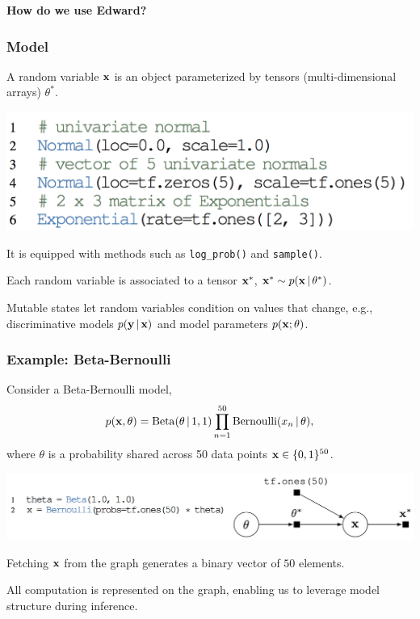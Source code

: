 \documentclass[10pt,
               xcolor={usenames,dvipsnames},
               hyperref={colorlinks,linktoc=all,citecolor=Plum,linkcolor=MidnightBlue,urlcolor=MidnightBlue},noamssymb]{beamer}
\begin{document}
\begin{frame}
\begin{center}
{\Large\bf How do we use Edward?}
\end{center}
\end{frame}

\begin{frame}
\frametitle{Model}
A random variable $\boldsymbol{\mathbf{x}}$ is an object parameterized by tensors
(multi-dimensional arrays) $\theta^*$.

\vspace{-1.0ex}
\includegraphics[height=0.20\textwidth]{img/random_variables.png}

It is equipped with methods such as \texttt{log\_prob()} and \texttt{sample()}.

Each random variable is associated to a tensor $\boldsymbol{\mathbf{x}}^*$, $\boldsymbol{\mathbf{x}}^*\sim p(\boldsymbol{\mathbf{x}}\,|\,\theta^*)$.

Mutable states let random variables condition on values that
change, e.g., discriminative models $p(\boldsymbol{\mathbf{y}}\,|\,\boldsymbol{\mathbf{x}})$ and model
parameters $p(\boldsymbol{\mathbf{x}}; \theta)$.
\end{frame}

\begin{frame}
\frametitle{Example: Beta-Bernoulli}
Consider a Beta-Bernoulli model,
\begin{align*}
p(\boldsymbol{\mathbf{x}}, \theta) =
\operatorname{Beta}(\theta\,|\, 1, 1)
\prod_{n=1}^{50} \operatorname{Bernoulli}(x_n\,|\, \theta),
\end{align*}
where $\theta$
is a probability shared across 50 data points $\boldsymbol{\mathbf{x}}\in\{0,1\}^{50}$.
\begin{center}
\vspace{-2ex}
\includegraphics[height=0.175\textwidth]{img/beta-bernoulli.png}
\end{center}
Fetching $\boldsymbol{\mathbf{x}}$ from the graph generates a binary vector of $50$ elements.

All computation is represented on the graph, enabling us to leverage model structure during inference.
\end{frame}
\end{document}
